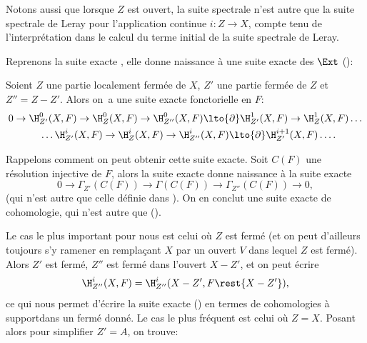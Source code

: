 Notons aussi que lorsque $Z$ est ouvert, la suite spectrale  n'est autre que la suite spectrale de Leray pour l'application continue $i: Z \to X$, compte tenu de l'interpr\'etation  dans le calcul du terme initial de la suite spectrale de Leray.

\bigskip Reprenons la suite exacte , elle donne naissance \`a une suite exacte des $\Ext$ (\cf {}):

\begin{theoreme} \label{I.2.8}
Soient $Z$ une partie localement ferm\'ee de $X$, $Z'$ une partie ferm\'ee de $Z$ et $Z''=Z-Z'$. Alors on~a une suite exacte fonctorielle en $F$:
\begin{equation} \label{eq:I.24}
\begin{gathered}
0 \to \H_{Z'}^0(X, F) \to \H_Z^0(X, F) \to \H_{Z''}^0(X, F)\lto{\partial} \H^1_{Z'}(X, F) \to \H^1_Z(X, F) \dots \\
\phantom{0}\dots \H_{Z'}^i(X, F) \to \H_Z^i(X, F) \to \H_{Z''}^i(X, F)\lto{\partial} \H^{i+1}_{Z'}(X, F)\dots.
\end{gathered}
\end{equation}
\end{theoreme}

Rappelons comment on peut obtenir cette suite exacte. Soit $C(F)$ une r\'esolution injective de $F$, alors la suite exacte  donne naissance \`a la suite exacte
\begin{equation} \label{eq:I.25} {0 \to \Gamma_{Z'}(C(F)) \to \Gamma(C(F)) \to \Gamma_{Z''}(C(F)) \to 0},
\end{equation}
(qui n'est autre que celle d\'efinie dans ). On en conclut une suite exacte de cohomologie, qui n'est autre que ().

Le cas le plus important pour nous est celui o\`u $Z$ est ferm\'e (et
on peut d'ailleurs toujours s'y ramener en rempla\c cant $X$ par
un ouvert $V$ dans lequel $Z$ est ferm\'e). Alors $Z'$ est ferm\'e,
$Z''$ est ferm\'e dans l'ouvert $X-Z'$, et on peut \'ecrire
\begin{equation} \label{eq:I.26} {\H^i_{Z''}(X, F)=\H^i_{Z''}(X-Z', F\rest{X-Z'})},
\end{equation}
ce qui nous permet d'\'ecrire la suite exacte () en termes de cohomologies \`a support\pageoriginale dans un ferm\'e donn\'e. Le cas le plus fr\'equent est celui o\`u $Z=X$. Posant alors pour simplifier $Z'=A$, on trouve:

